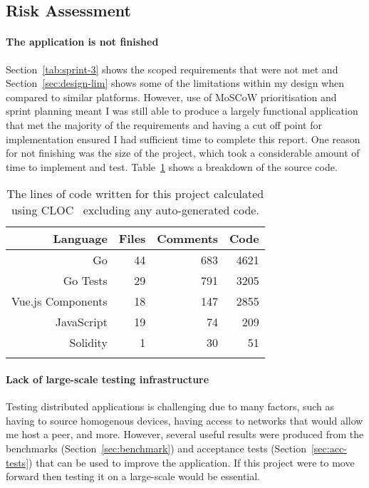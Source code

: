 \subsection*{Risk Assessment}




\paragraph*{The application is not finished}
Section~\ref{tab:sprint-3} shows the scoped requirements that were not met and Section~\ref{sec:design-lim} shows some of the limitations within my design when compared to similar platforms. However, use of MoSCoW prioritisation and sprint planning meant I was still able to produce a largely functional application that met the majority of the requirements and having a cut off point for implementation ensured I had sufficient time to complete this report.
\x
One reason for not finishing was the size of the project, which took a considerable amount of time to implement and test. Table~\ref{tab:cloc} shows a breakdown of the source code.

\begin{longtable}{ r r r r }
  \toprule
  \textbf{Language} & \textbf{Files} & \textbf{Comments} & \textbf{Code}
  \\\midrule\midrule
  Go
  & 44
  & 683
  & 4621
  \\
  Go Tests
  & 29
  & 791
  & 3205
  \\
  Vue.js Components
  & 18
  & 147
  & 2855
  \\
  JavaScript
  & 19
  & 74
  & 209
  \\
  Solidity
  & 1
  & 30
  & 51
  \\\bottomrule\bottomrule
  \caption{The lines of code written for this project calculated using CLOC~\cite{noauthor_aldanialcloc_nodate} excluding any auto-generated code.}
  \label{tab:cloc}
\end{longtable}

\paragraph*{Lack of large-scale testing infrastructure}
Testing distributed applications is challenging due to many factors, such as having to source homogenous devices, having access to networks that would allow me host a peer, and more. However, several useful results were produced from the benchmarks (Section~\ref{sec:benchmark}) and acceptance tests (Section~\ref{sec:acc-tests}) that can be used to improve the application. If this project were to move forward then testing it on a large-scale would be essential.